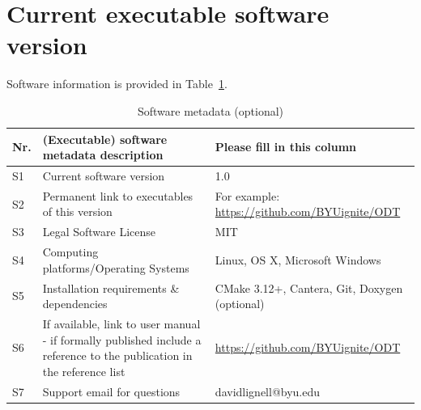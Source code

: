 \documentclass[preprint,12pt, a4paper]{elsarticle}
\begin{document}
\section*{Current executable software version}
\label{software_version}

Software information is provided in Table~\ref{t:software}.


\begin{table}[!h]
\begin{tabular}{|l|p{6.5cm}|p{6.5cm}|}
\hline
\textbf{Nr.} & \textbf{(Executable) software metadata description} & \textbf{Please fill in this column} \\
\hline
S1 & Current software version & 1.0 \\
\hline
S2 & Permanent link to executables of this version  & For example: \href{https://github.com/BYUignite/ODT}{https://github.com/BYUignite/ODT} \\
\hline
S3 & Legal Software License & MIT \\
\hline
S4 & Computing platforms/Operating Systems & Linux, OS X, Microsoft Windows\\
\hline
S5 & Installation requirements \& dependencies & CMake 3.12+, Cantera, Git, Doxygen (optional) \\
\hline
S6 & If available, link to user manual - if formally published include a reference to the publication in the reference list & \href{https://github.com/BYUignite/ODT}{https://github.com/BYUignite/ODT}\\
\hline
S7 & Support email for questions & davidlignell@byu.edu \\
\hline
\end{tabular}
\caption{Software metadata (optional)}
\label{t:software}
\end{table}
\end{document}

